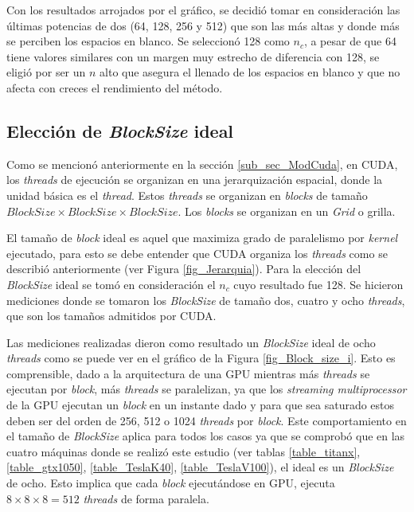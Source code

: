 \documentclass[10pt, conference, compsocconf, onecolumn]{IEEEtran}
\begin{document}
 Con los resultados arrojados por el gr\'afico, se decidi\'o tomar en consideraci\'on las \'ultimas potencias de dos (64, 128, 256 y 512) que son las m\'as altas y donde m\'as se perciben los espacios en blanco. Se seleccion\'o 128 como $n_{c}$, a pesar de que 64 tiene valores similares con un margen muy estrecho  de diferencia con 128, se eligi\'o por ser un $n$ alto que asegura el llenado de los espacios en blanco y que no afecta con creces el rendimiento del m\'etodo.
 




\subsection{Elecci\'on de \textit{BlockSize} ideal}
\label{ele_blocksize}

Como se mencion\'o anteriormente en la secci\'on \ref{sub_sec_ModCuda}, en CUDA, los \textit{threads} de ejecuci\'on se organizan en una jerarquizaci\'on espacial, donde la unidad b\'asica es el \textit{thread}. Estos \textit{threads} se organizan en \textit{blocks} de tama\~no $BlockSize \times BlockSize \times BlockSize$. Los \textit{blocks} se organizan en un \textit{Grid} o grilla.

El tama\~no de \textit{block} ideal es aquel que maximiza grado de paralelismo por \textit{kernel} ejecutado, para esto se debe entender que CUDA organiza los \textit{threads} como se describi\'o anteriormente (ver Figura \ref{fig_Jerarquia}).
Para la elecci\'on del \textit{BlockSize} ideal se tom\'o en consideraci\'on el $n_{c}$ cuyo resultado fue 128. Se hicieron mediciones donde se tomaron los \textit{BlockSize} de tama\~no dos, cuatro y ocho \textit{threads}, que son los tama\~nos admitidos por CUDA. 



Las mediciones realizadas dieron como resultado un \textit{BlockSize} ideal de ocho \textit{threads} como se puede ver en el gr\'afico de la Figura \ref{fig_Block_size_i}. Esto es comprensible, dado a la arquitectura de una GPU mientras m\'as \textit{threads} se ejecutan por \textit{block}, m\'as \textit{threads} se paralelizan, ya que los \textit{streaming multiprocessor} de la GPU ejecutan un \textit{block} en un instante dado y para que sea saturado estos deben ser del orden de 256, 512 o 1024 \textit{threads} por \textit{block}. Este comportamiento en el tama\~no de \textit{BlockSize} aplica para todos los casos ya que se comprob\'o que en las cuatro m\'aquinas donde se realiz\'o este estudio (ver tablas \ref{table_titanx}, \ref{table_gtx1050}, \ref{table_TeslaK40}, \ref{table_TeslaV100}), el ideal es un \textit{BlockSize} de ocho. Esto implica que cada \textit{block} ejecut\'andose en GPU, ejecuta $8 \times 8 \times 8=512 $ \textit{threads} de forma paralela.
\end{document}
